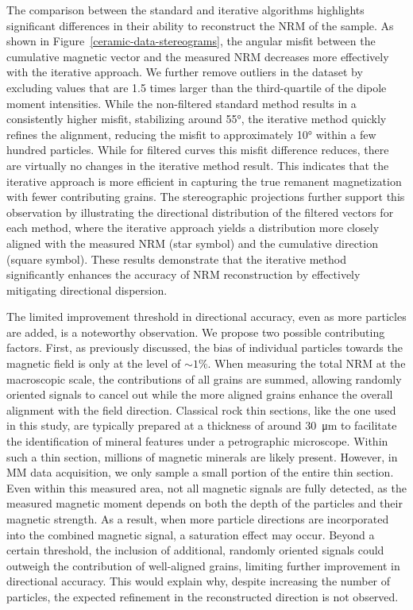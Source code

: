 The comparison between the standard and iterative algorithms highlights significant differences in their ability to reconstruct the NRM of the sample. As shown in Figure~\ref{ceramic-data-stereograms}, the angular misfit between the cumulative magnetic vector and the measured NRM decreases more effectively with the iterative approach. We further remove outliers in the dataset by excluding values that are 1.5 times larger than the third-quartile of the dipole moment intensities. While the non-filtered standard method results in a consistently higher misfit, stabilizing around \ang{55}, the iterative method quickly refines the alignment, reducing the misfit to approximately \ang{10} within a few hundred particles. While for filtered curves this misfit difference reduces, there are virtually no changes in the iterative method result. This indicates that the iterative approach is more efficient in capturing the true remanent magnetization with fewer contributing grains. The stereographic projections further support this observation by illustrating the directional distribution of the filtered vectors for each method, where the iterative approach yields a distribution more closely aligned with the measured NRM (star symbol) and the cumulative direction (square symbol). These results demonstrate that the iterative method significantly enhances the accuracy of NRM reconstruction by effectively mitigating directional dispersion.

The limited improvement threshold in directional accuracy, even as more particles are added, is a noteworthy observation. We propose two possible contributing factors. First, as previously discussed, the bias of individual particles towards the magnetic field is only at the level of $\sim1\%$. When measuring the total NRM at the macroscopic scale, the contributions of all grains are summed, allowing randomly oriented signals to cancel out while the more aligned grains enhance the overall alignment with the field direction. Classical rock thin sections, like the one used in this study, are typically prepared at a thickness of around \qty{30}{\um} to facilitate the identification of mineral features under a petrographic microscope. Within such a thin section, millions of magnetic minerals are likely present. However, in MM data acquisition, we only sample a small portion of the entire thin section. Even within this measured area, not all magnetic signals are fully detected, as the measured magnetic moment depends on both the depth of the particles and their magnetic strength. As a result, when more particle directions are incorporated into the combined magnetic signal, a saturation effect may occur. Beyond a certain threshold, the inclusion of additional, randomly oriented signals could outweigh the contribution of well-aligned grains, limiting further improvement in directional accuracy. This would explain why, despite increasing the number of particles, the expected refinement in the reconstructed direction is not observed.

